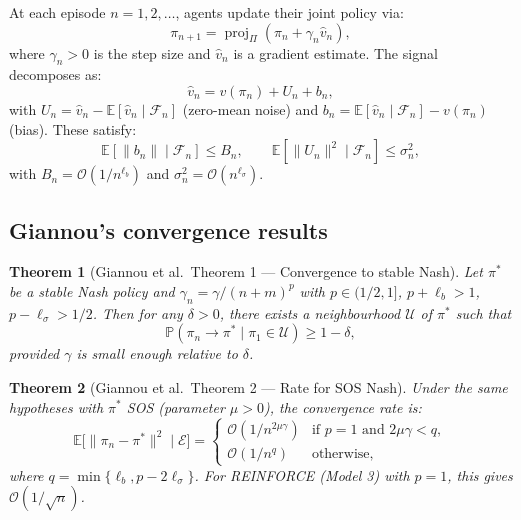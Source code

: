 \documentclass[11pt,a4paper]{article}
\newtheorem{theorem}{Theorem}[section]
\DeclareMathOperator{\proj}{proj}
\newcommand{\E}{\mathbb{E}}
\newcommand{\Prob}{\mathbb{P}}
\newcommand{\cF}{\mathcal{F}}
\newcommand{\cU}{\mathcal{U}}
\newcommand{\cE}{\mathcal{E}}
\begin{document}
At each episode $n = 1, 2, \ldots$, agents update their joint policy via:
\begin{equation}
\label{eq:pg}
\tag{PG}
    \pi_{n+1} = \proj_\Pi(\pi_n + \gamma_n \hat{v}_n),
\end{equation}
where $\gamma_n > 0$ is the step size and $\hat{v}_n$ is a gradient estimate. The signal decomposes as:
\begin{equation}
\label{eq:signal-decomp}
    \hat{v}_n = v(\pi_n) + U_n + b_n,
\end{equation}
with $U_n = \hat{v}_n - \E[\hat{v}_n \mid \cF_n]$ (zero-mean noise) and $b_n = \E[\hat{v}_n \mid \cF_n] - v(\pi_n)$ (bias). These satisfy:
\begin{equation}
\label{eq:bias-variance}
    \E[\|b_n\| \mid \cF_n] \leq B_n, \qquad \E[\|U_n\|^2 \mid \cF_n] \leq \sigma_n^2,
\end{equation}
with $B_n = \mathcal{O}(1/n^{\ell_b})$ and $\sigma_n^2 = \mathcal{O}(n^{\ell_\sigma})$.

\subsection{Giannou's convergence results}

\begin{theorem}[Giannou et al.\ Theorem 1 --- Convergence to stable Nash]
\label{thm:giannou1}
Let $\pi^*$ be a stable Nash policy and $\gamma_n = \gamma/(n+m)^p$ with $p \in (1/2, 1]$, $p + \ell_b > 1$, $p - \ell_\sigma > 1/2$. Then for any $\delta > 0$, there exists a neighbourhood $\cU$ of $\pi^*$ such that
\[
    \Prob(\pi_n \to \pi^* \mid \pi_1 \in \cU) \geq 1 - \delta,
\]
provided $\gamma$ is small enough relative to $\delta$.
\end{theorem}

\begin{theorem}[Giannou et al.\ Theorem 2 --- Rate for SOS Nash]
\label{thm:giannou2}
Under the same hypotheses with $\pi^*$ SOS (parameter $\mu > 0$), the convergence rate is:
\[
    \E\bigl[\|\pi_n - \pi^*\|^2 \mid \cE\bigr] = \begin{cases}
        \mathcal{O}(1/n^{2\mu\gamma}) & \text{if } p = 1 \text{ and } 2\mu\gamma < q, \\
        \mathcal{O}(1/n^q) & \text{otherwise},
    \end{cases}
\]
where $q = \min\{\ell_b, p - 2\ell_\sigma\}$. For REINFORCE (Model 3) with $p = 1$, this gives $\mathcal{O}(1/\sqrt{n})$.
\end{theorem}
\end{document}

